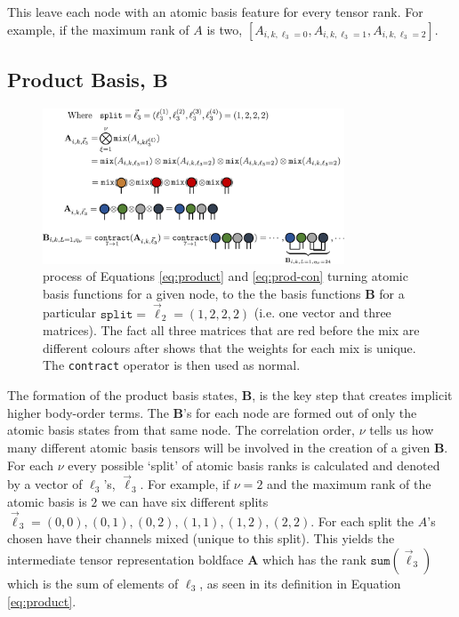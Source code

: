 This leave each node with an atomic basis feature for every tensor rank. For example, if the maximum rank of $A$ is two, $[A_{i,k,\ell_3=0},A_{i,k,\ell_3=1},A_{i,k,\ell_3=2}]$. 


\subsection{Product Basis, $\mathbf{B}$}

\begin{figure}[H]
    \centering
    \includegraphics[width=0.8\textwidth]{figures/product-basis.png}
    \caption{process of Equations \ref{eq:product} and \ref{eq:prod-con} turning atomic basis functions for a given node, to the the basis functions $\mathbf B$ for a particular $\texttt{split}=\vec\ell_2 = (1,2,2,2)$ (i.e. one vector and three matrices). The fact all three matrices that are red before the mix are different colours after shows that the weights for each mix is unique. The \texttt{contract} operator is then used as normal.}
    \label{fig:product-basis}
\end{figure}

The formation of the product basis states, $\mathbf{B}$, is the key step that creates implicit higher body-order terms. The $\mathbf B$'s for each node are formed out of only the atomic basis states from that same node. The correlation order, $\nu$ tells us how many different atomic basis tensors will be involved in the creation of a given $\mathbf{B}$.  For each $\nu$ every possible `split' of atomic basis ranks is calculated and denoted by a vector of $\ell_3$'s, $\vec \ell_3$. For example, if $\nu=2$ and the maximum rank of the atomic basis is $2$ we can have six different splits $\vec\ell_3 =(0,0), (0,1), (0,2), (1,1), (1,2), (2,2)$. For each split the $A$'s chosen have their channels mixed (unique to this split). This yields the intermediate tensor representation boldface $\mathbf{A}$ which has the rank $\texttt{sum}(\vec\ell_3)$ which is the sum of elements of $\ell_3$, as seen in its definition in Equation \ref{eq:product}.

